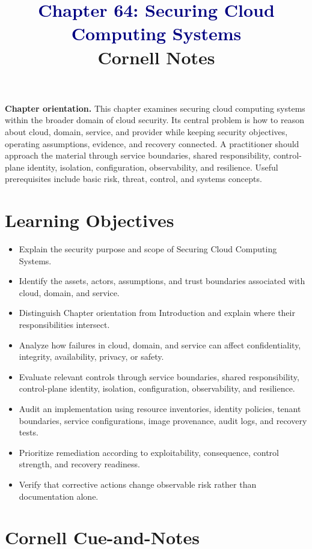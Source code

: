 \documentclass[11pt]{article}
\title{\textcolor{Navy}{Chapter 64: Securing Cloud Computing Systems}\\[2mm]\large Cornell Notes}
\author{}
\date{}
\begin{document}
\maketitle
\thispagestyle{fancy}
\vspace{-1.5em}
\begin{orientationbox}
\textbf{Chapter orientation.} This chapter examines securing cloud computing systems within the broader domain of cloud security. Its central problem is how to reason about cloud, domain, service, and provider while keeping security objectives, operating assumptions, evidence, and recovery connected. A practitioner should approach the material through service boundaries, shared responsibility, control-plane identity, isolation, configuration, observability, and resilience. Useful prerequisites include basic risk, threat, control, and systems concepts.
\end{orientationbox}
\section*{Learning Objectives}
\begin{itemize}
\item Explain the security purpose and scope of Securing Cloud Computing Systems.
\item Identify the assets, actors, assumptions, and trust boundaries associated with cloud, domain, and service.
\item Distinguish Chapter orientation from Introduction and explain where their responsibilities intersect.
\item Analyze how failures in cloud, domain, and service can affect confidentiality, integrity, availability, privacy, or safety.
\item Evaluate relevant controls through service boundaries, shared responsibility, control-plane identity, isolation, configuration, observability, and resilience.
\item Audit an implementation using resource inventories, identity policies, tenant boundaries, service configurations, image provenance, audit logs, and recovery tests.
\item Prioritize remediation according to exploitability, consequence, control strength, and recovery readiness.
\item Verify that corrective actions change observable risk rather than documentation alone.
\end{itemize}
\section*{Cornell Cue-and-Notes}
\end{document}
